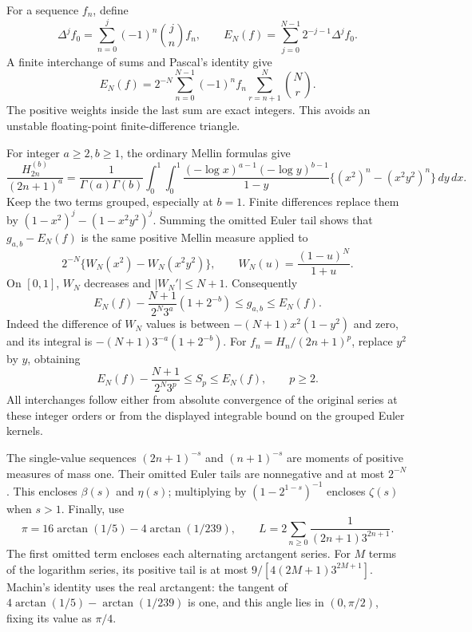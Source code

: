 For a sequence $f_n$, define
\[
 \Delta^jf_0=\sum_{n=0}^j(-1)^n\binom jn f_n,
 \qquad E_N(f)=\sum_{j=0}^{N-1}2^{-j-1}\Delta^jf_0.
\]
A finite interchange of sums and Pascal's identity give
\begin{equation}\label{mix:eq:finite-euler}
 E_N(f)=2^{-N}\sum_{n=0}^{N-1}(-1)^n f_n
                    \sum_{r=n+1}^N\binom Nr.
\end{equation}
The positive weights inside the last sum are exact integers. This
avoids an unstable floating-point finite-difference triangle.

For integer $a\ge2,b\ge1$, the ordinary Mellin formulas give
\[
 \frac{H_{2n}^{(b)}}{(2n+1)^a}
 =\frac1{\Gamma(a)\Gamma(b)}\int_0^1\int_0^1
 \frac{(-\log x)^{a-1}(-\log y)^{b-1}}{1-y}
       \{(x^2)^n-(x^2y^2)^n\}\,dy\,dx.
\]
Keep the two terms grouped, especially at $b=1$. Finite differences
replace them by $(1-x^2)^j-(1-x^2y^2)^j$. Summing the omitted Euler tail
shows that $g_{a,b}-E_N(f)$ is the same positive Mellin measure applied
to
\[
 2^{-N}\{W_N(x^2)-W_N(x^2y^2)\},\qquad
 W_N(u)=\frac{(1-u)^N}{1+u}.
\]
On $[0,1]$, $W_N$ decreases and $|W_N'|\le N+1$. Consequently
\begin{equation}\label{mix:eq:g-bound}
 E_N(f)-\frac{N+1}{2^N3^a}(1+2^{-b})
       \le g_{a,b}\le E_N(f).
\end{equation}
Indeed the difference of $W_N$ values is between
$-(N+1)x^2(1-y^2)$ and zero, and its integral is
$-(N+1)3^{-a}(1+2^{-b})$.
For $f_n=H_n/(2n+1)^p$, replace $y^2$ by $y$, obtaining
\begin{equation}\label{mix:eq:S-bound}
 E_N(f)-\frac{N+1}{2^N3^p}\le S_p\le E_N(f),\qquad p\ge2.
\end{equation}
All interchanges follow either from absolute convergence of the
original series at these integer orders or from the displayed integrable
bound on the grouped Euler kernels.

The single-value sequences $(2n+1)^{-s}$ and $(n+1)^{-s}$ are moments
of positive measures of mass one. Their omitted Euler tails are
nonnegative and at most $2^{-N}$. This encloses $\beta(s)$ and
$\eta(s)$; multiplying by $(1-2^{1-s})^{-1}$ encloses $\zeta(s)$
when $s>1$. Finally, use
\[
 \pi=16\arctan(1/5)-4\arctan(1/239),\qquad
 L=2\sum_{n\ge0}\frac1{(2n+1)3^{2n+1}}.
\]
The first omitted term encloses each alternating arctangent series.
For $M$ terms of the logarithm series, its positive tail is at most
$9/[4(2M+1)3^{2M+1}]$.  Machin's identity uses the real arctangent:
the tangent of $4\arctan(1/5)-\arctan(1/239)$ is one, and this angle
lies in $(0,\pi/2)$, fixing its value as $\pi/4$.

